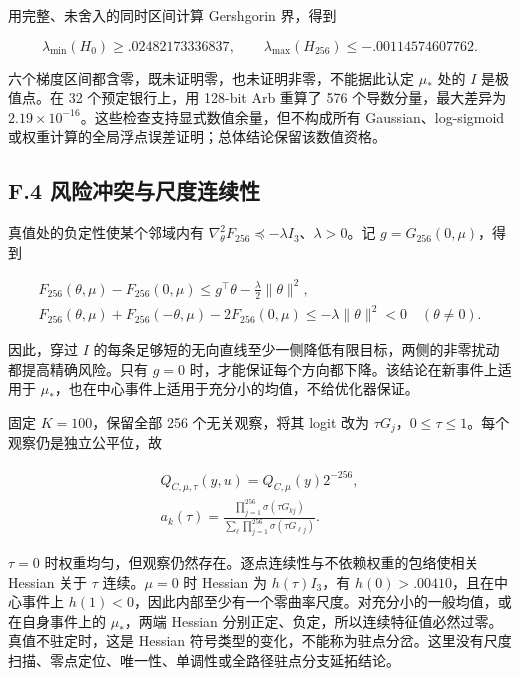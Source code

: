 \documentclass[11pt,a4paper]{article}
\begin{document}
用完整、未舍入的同时区间计算 Gershgorin 界，得到

\[
\lambda_{\min}(H_0)\ge .02482173336837,\qquad
\lambda_{\max}(H_{256})\le-.00114574607762.
\tag{F.10}
\]

六个梯度区间都含零，既未证明零，也未证明非零，不能据此认定 \(\mu_*\)
处的 \(I\) 是极值点。在 32 个预定银行上，用 128-bit Arb 重算了 576
个导数分量，最大差异为
\(2.19\times10^{-16}\)。这些检查支持显式数值余量，但不构成所有
Gaussian、log-sigmoid
或权重计算的全局浮点误差证明；总体结论保留该数值资格。

\subsection*{F.4
风险冲突与尺度连续性}\label{f.4-ux98ceux9669ux51b2ux7a81ux4e0eux5c3aux5ea6ux8fdeux7eedux6027}

真值处的负定性使某个邻域内有
\(\nabla_\theta^2F_{256}\preceq-\lambda I_3\)、\(\lambda>0\)。记
\(g=G_{256}(0,\mu)\)，得到

\[
\begin{gathered}
F_{256}(\theta,\mu)-F_{256}(0,\mu)
\le g^\top\theta-\frac\lambda2\|\theta\|^2,\\
F_{256}(\theta,\mu)+F_{256}(-\theta,\mu)-2F_{256}(0,\mu)
\le-\lambda\|\theta\|^2<0\quad(\theta\ne0).
\end{gathered}
\tag{F.11}
\]

因此，穿过 \(I\)
的每条足够短的无向直线至少一侧降低有限目标，两侧的非零扰动都提高精确风险。只有
\(g=0\) 时，才能保证每个方向都下降。该结论在新事件上适用于
\(\mu_*\)，也在中心事件上适用于充分小的均值，不给优化器保证。

固定 \(K=100\)，保留全部 256 个无关观察，将其 logit 改为
\(\tau G_j\)，\(0\le\tau\le1\)。每个观察仍是独立公平位，故

\[
\begin{gathered}
Q_{C,\mu,\tau}(y,u)=Q_{C,\mu}(y)2^{-256},\\
a_k(\tau)=\frac{\prod_{j=1}^{256}\sigma(\tau G_{kj})}
{\sum_\ell\prod_{j=1}^{256}\sigma(\tau G_{\ell j})}.
\end{gathered}
\tag{F.12}
\]

\(\tau=0\)
时权重均匀，但观察仍然存在。逐点连续性与不依赖权重的包络使相关 Hessian
关于 \(\tau\) 连续。\(\mu=0\) 时 Hessian 为 \(h(\tau)I_3\)，有
\(h(0)>.00410\)，且在中心事件上
\(h(1)<0\)，因此内部至少有一个零曲率尺度。对充分小的一般均值，或在自身事件上的
\(\mu_*\)，两端 Hessian
分别正定、负定，所以连续特征值必然过零。真值不驻定时，这是 Hessian
符号类型的变化，不能称为驻点分岔。这里没有尺度扫描、零点定位、唯一性、单调性或全路径驻点分支延拓结论。
\end{document}
